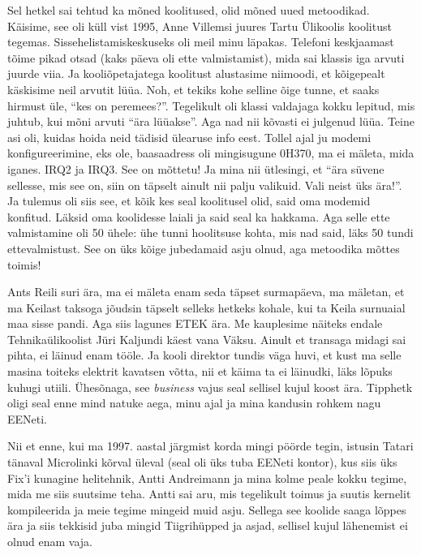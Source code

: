 Sel hetkel sai tehtud ka mõned koolitused,  olid mõned uued metoodikad. 
Käisime, see oli küll vist 1995, Anne Villemsi juures 
Tartu Ülikoolis koolitust tegemas. 
Sissehelistamiskeskuseks oli meil minu läpakas. Telefoni keskjaamast tõime 
pikad otsad (kaks päeva oli ette valmistamist), mida sai klassis iga arvuti 
juurde viia. Ja  kooliõpetajatega koolitust alustasime niimoodi, et kõigepealt 
käskisime neil arvutit lüüa.  Noh, et tekiks kohe selline õige tunne, et saaks 
hirmust üle, \enquote{kes on peremees?}. Tegelikult oli klassi valdajaga kokku 
lepitud, mis juhtub, kui mõni arvuti \enquote{ära lüüakse}. Aga nad nii kõvasti 
ei julgenud lüüa. Teine asi oli, kuidas hoida neid tädisid ülearuse info eest. 
Tollel ajal ju modemi konfigureerimine, eks ole, baasaadress oli mingisugune 
0H370, ma ei mäleta, mida iganes. IRQ2 ja IRQ3. See on mõttetu! Ja mina nii 
ütlesingi, et \enquote{ära süvene sellesse, mis see on, siin on täpselt ainult 
nii palju valikuid. Vali neist üks ära!}. Ja tulemus oli siis see, et kõik kes 
seal koolitusel olid, said oma modemid konfitud. Läksid oma koolidesse laiali 
ja said seal ka hakkama. Aga selle ette valmistamine oli 50 ühele: ühe tunni 
hoolitsuse kohta, mis nad said, läks 50 tundi ettevalmistust. See on üks kõige 
jubedamaid asju olnud, aga metoodika mõttes toimis! 

Ants Reili suri ära, ma ei mäleta enam seda täpset 
surmapäeva, ma mäletan, et ma Keilast taksoga jõudsin täpselt selleks hetkeks 
kohale, kui ta Keila surnuaial maa sisse pandi. Aga siis lagunes ETEK ära. Me 
kauplesime näiteks endale Tehnikaülikoolist Jüri 
Kaljundi käest vana Väksu. Ainult et 
transaga midagi sai pihta, ei läinud enam tööle. Ja kooli direktor tundis väga 
huvi, et kust ma selle masina toiteks elektrit kavatsen võtta, nii et käima ta 
ei läinudki, läks lõpuks kuhugi utiili. Ühesõnaga, see \emph{business} vajus 
seal sellisel kujul koost ära. Tipphetk oligi seal enne mind natuke aega, minu 
ajal ja mina kandusin rohkem nagu EENeti. 

Nii et enne, kui ma 1997. aastal järgmist korda mingi pöörde tegin, istusin  
Tatari tänaval Microlinki kõrval üleval (seal oli üks tuba EENeti kontor), kus 
siis üks Fix'i kunagine helitehnik, Antti Andreimann ja  mina  kolme peale kokku tegime, mida me siis suutsime teha. Antti 
sai aru, mis tegelikult toimus ja suutis kernelit kompileerida ja meie tegime 
mingeid muid asju. Sellega see koolide saaga lõppes ära ja siis tekkisid juba 
mingid Tiigrihüpped ja asjad, sellisel kujul lähenemist ei 
olnud enam vaja. 

